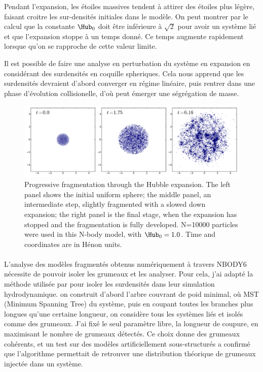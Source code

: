 Pendant l'expansion, les \'etoiles massives tendent \`a attirer des \'etoiles plus l\'eg\`ere, faisant croitre les sur-densit\'es initiales dans le mod\`ele. On peut montrer par le calcul que la constante $\Hub_0$ doit \^etre inf\'erieure \`a $\sqrt{2}$ pour avoir un syst\`eme li\'e et que l'expansion stoppe \`a un temps donn\'e. Ce temps augmente rapidement lorsque qu'on se rapproche de cette valeur limite.

Il est possible de faire une analyse en perturbation du syst\`eme en expansion en consid\'erant des surdensit\'es en coquille spheriques. Cela nous apprend que les surdensit\'es devraient d'abord converger en r\'egime lin\'eaire, puis rentrer dans une phase d'\'evolution collisionelle, d'o\`u peut \'emerger une s\'egr\'egation de masse.


\begin{figure}
\begin{center}
\includegraphics[width=\textwidth]{Figures/2_fragmentation}
\caption[Fragmentation of a \HubLem model]{Progressive fragmentation through the Hubble expansion. The left panel shows the initial uniform sphere; the middle panel, an intermediate step, slightly fragmented with a slowed down expansion; the right panel is the final stage, when the expansion has stopped and the fragmentation is fully developed. N=10000 particles were used in this N-body model, with $\Hub_0 = 1.0$. Time and coordinates are in H\'enon units.}
\label{Fig:resume_fragmentation}
\end{center}
\end{figure}


\paragraph*{}
L'analyse des mod\`eles fragment\'es obtenus num\'eriquement \`a travers NBODY6 n\'ecessite de pouvoir isoler les grumeaux et les analyser. Pour cela, j'ai adapt\'e la m\'ethode utilis\'ee par \cite{Maschberger2010} pour isoler les surdensit\'es dans leur simulation hydrodynamique. on construit d'abord l'arbre couvrant de poid minimal, où MST (Minimum Spanning Tree) du syst\`eme, puis en coupant toutes les branches plus longues qu'une certaine longueur, on consid\`ere tous les syst\`emes li\'es et isol\'es comme des grumeaux. J'ai fix\'e le seul param\`etre libre, la longueur de coupure, en maximisant le nombre de grumeaux d\'etect\'es. Ce choix donne des grumeaux coh\'erents, et un test sur des modèles artificiellement sous-structurés a confirm\'e que l'algorithme permettait de retrouver une distribution th\'eorique de grumeaux inject\'ee dans un syst\`eme.


